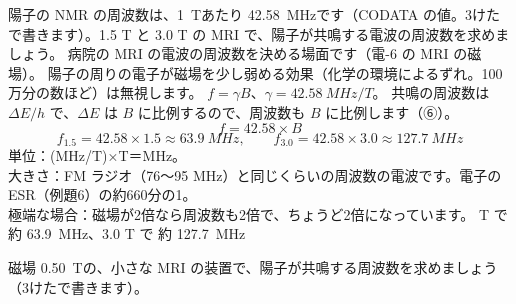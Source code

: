 \label{ph:原-7:ex7}
\begin{phreidai}
陽子の NMR の周波数は、\qty{1}{T}あたり \qty{42.58}{MHz}です（CODATA の値。3けたで書きます）。1.5 T と 3.0 T の MRI で、陽子が共鳴する電波の周波数を求めましょう。
\phbamen
病院の MRI の電波の周波数を決める場面です（電-6 の MRI の磁場）。
\phmushi
陽子の周りの電子が磁場を少し弱める効果（化学の環境によるずれ。100万分の数ほど）は無視します。
\phzu
$f=\gamma B$、$\gamma=\qty{42.58}{MHz/T}$。
\phriyu
共鳴の周波数は $\Delta E/h$ で、$\Delta E$ は $B$ に比例するので、周波数も $B$ に比例します（⑥）。
\phtateru
\[ f=42.58\times B \]
\phtoku
\[ f_{1.5}=42.58\times1.5\approx\qty{63.9}{MHz},\qquad f_{3.0}=42.58\times3.0\approx\qty{127.7}{MHz} \]
\phtashikame
単位：(MHz/T)×T＝MHz。\\
大きさ：FM ラジオ（76〜95 MHz）と同じくらいの周波数の電波です。電子の ESR（例題6）の約660分の1。\\
極端な場合：磁場が2倍なら周波数も2倍で、ちょうど2倍になっています。
 T で 約 \qty{63.9}{MHz}、3.0 T で 約 \qty{127.7}{MHz}
\end{phreidai}
\begin{jibun}
磁場 \qty{0.50}{T}の、小さな MRI の装置で、陽子が共鳴する周波数を求めましょう（3けたで書きます）。
\end{jibun}

